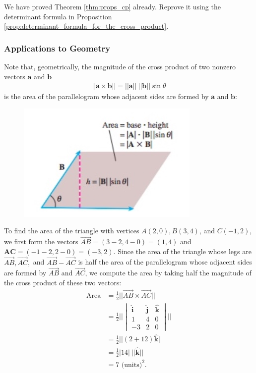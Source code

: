 \documentclass[12pt,letterpaper,reqno]{article}
\numberwithin{equation}{section}
\begin{document}
\begin{exercise}
We have proved Theorem \ref{thm:props_cp} already. Reprove it using the determinant formula in Proposition \ref{prop:determinant_formula_for_the_cross_product}.
\end{exercise}

\subsubsection{Applications to Geometry}
Note that, geometrically, the magnitude of the cross product of two nonzero vectors $\mathbf{a}$ and $\mathbf{b}$
\begin{align*}
	||\mathbf{a} \times \mathbf{b}||=||\mathbf{a}|| \ ||\mathbf{b}||\sin\theta
\end{align*}
is the area of the parallelogram whose adjacent sides are formed by $\mathbf{a}$ and $\mathbf{b}$:
\begin{figure}[h]
	\begin{center}
		\includegraphics[scale=0.5]{figures_mvc/cp_pg}
	\end{center}
\end{figure}

\begin{example}
To find the area of the triangle with vertices $A(2,0), B(3,4)$, and $C(-1,2)$, we first form the vectors $\overrightarrow{AB}=(3-2,4-0)=(1,4)$ and $\mathbf{AC}=(-1-2,2-0)=(-3,2)$. Since the area of the triangle whose legs are $\overrightarrow{AB}, \overrightarrow{AC},$ and $\overrightarrow{AB}-\overrightarrow{AC}$ is half the area of the parallelogram whose adjacent sides are formed by $\overrightarrow{AB}$ and $\overrightarrow{AC}$, we compute the area by taking half the magnitude of the cross product of these two vectors:
\begin{align*}
	\text{Area}&=\frac{1}{2}||\overrightarrow{AB}\times \overrightarrow{AC}|| \\
	&=\frac{1}{2} || \begin{vmatrix}
		\mathbf{\hat{i}} & \mathbf{\hat{j}} & \mathbf{\hat{k}} \\
		1 & 4 & 0 \\
		-3 & 2 & 0
	\end{vmatrix} || \\
	&=\frac{1}{2}||(2+12)\mathbf{\hat{k}}|| \\
	&=\frac{1}{2}|14| \ ||\mathbf{\hat{k}}|| \\
	&=7 \text{ (units)}^2.
\end{align*}	
\end{example}
\end{document}
